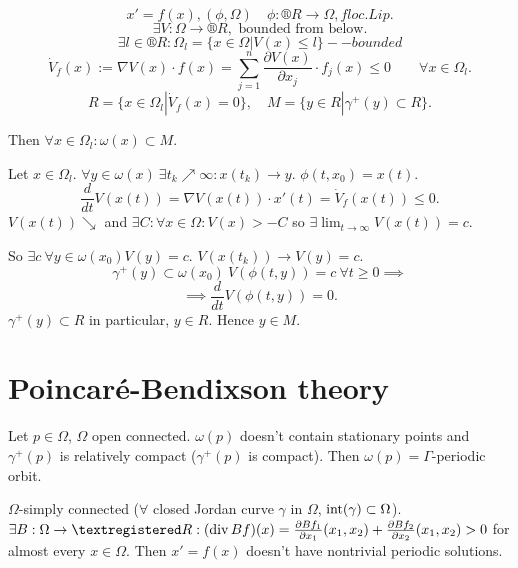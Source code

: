\documentclass[12pt]{article}					%
\begin{document}
\begin{veta}
	$$ x' = f(x), (\phi, \Omega) \quad \phi: ®R \rightarrow \Omega, f loc. Lip. $$
	$$ \exists V: \Omega \rightarrow ®R, \text{ bounded from below}. $$
	$$ \exists l \in ®R: \Omega_l = \{x \in \Omega | V(x) ≤ l\} -- bounded $$
	$$ \dot{V}_f(x) := \nabla V(x) · f(x) = \sum_{j=1}^n  \frac{\partial V(x)}{\partial x_j}·f_j(x) ≤ 0 \qquad \forall x \in \Omega_l. $$
	$$ R = \{x \in \Omega_l | \dot{V}_f(x) = 0\}, \quad M = \{y \in R | \gamma^+(y) \subset R\}. $$

	Then $\forall x \in \Omega_l: \omega(x) \subset M$.

	\begin{dukazin}
		Let $x \in \Omega_l$. $\forall y \in \omega(x)\ \exists t_k \nearrow ∞: x(t_k) \rightarrow y$. $\phi(t, x_0) = x(t)$.
		$$ \frac{d}{dt} V(x(t)) = \nabla V(x(t))·x'(t) = \dot{V}_f(x(t)) ≤ 0. $$
		$V(x(t)) \searrow$ and $\exists C: \forall x \in \Omega: V(x) > -C$ so $\exists \lim_{t \rightarrow ∞} V(x(t)) = c$.

		So $\exists c\ \forall y \in \omega(x_0) V(y) = c$. $V(x(t_k)) \rightarrow V(y) = c$.
		$$ \gamma^+(y) \subset \omega(x_0)\ V(\phi(t, y)) = c\ \forall t ≥ 0 \implies $$
		$$ \implies \frac{d}{dt}V(\phi(t, y)) = 0. $$
		$\gamma^+(y) \subset R$ in particular, $y \in R$. Hence $y \in M$.
	\end{dukazin}
\end{veta}

\section{Poincaré-Bendixson theory}
\begin{veta}
	Let $p \in \Omega$, $\Omega$ open connected. $\omega(p)$ doesn't contain stationary points and $\gamma^+(p)$ is relatively compact ($\gamma^+(p)$ is compact). Then $\omega(p) = \Gamma$-periodic orbit.
\end{veta}

\begin{veta}
	$\Omega$-simply connected ($\forall$ closed Jordan curve $\gamma$ in $\Omega$, $\operatorname{int}(\gamma) \subset \Omega$). $\exists B: \Omega \rightarrow ®R: (\Div Bf)(x) = \frac{\partial Bf_1}{\partial x_1}(x_1, x_2) + \frac{\partial Bf_2}{\partial x_2}(x_1, x_2) > 0$ for almost every $x \in \Omega$. Then $x' = f(x)$ doesn't have nontrivial periodic solutions.
\end{veta}
\end{document}
